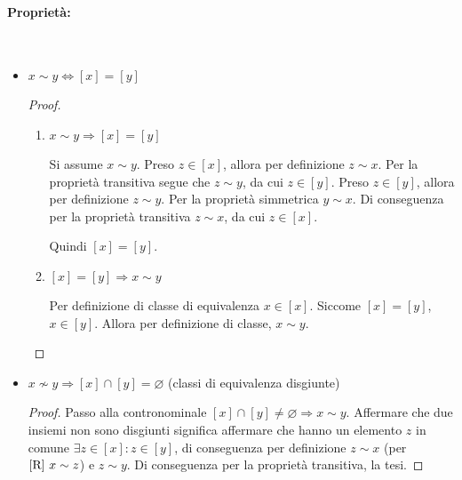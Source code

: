 \documentclass{article}     %
\begin{document}
\paragraph{Proprietà:}~
\begin{itemize}
    \item $x\sim y \Leftrightarrow [x]=[y]$
        \begin{proof}~
            \begin{enumerate}
                \item $x\sim y \Rightarrow [x]=[y]$
            
                Si assume $x\sim y$. 
                Preso $z\in [x]$, allora per definizione $z\sim x$. Per la proprietà transitiva segue che $z\sim y$, da cui $z\in [y]$.
                Preso $z\in [y]$, allora per definizione $z\sim y$. Per la proprietà simmetrica $y\sim x$. Di conseguenza per la proprietà transitiva $z\sim x$, da cui $z\in [x]$.
                
                Quindi $[x]=[y]$.
                \item $[x]=[y] \Rightarrow x\sim y$ 
            
                Per definizione di classe di equivalenza $x \in [x]$. Siccome $[x]=[y]$, $x\in [y]$. Allora per definizione di classe, $x\sim y$.
            \end{enumerate}
        \end{proof}
    \item $x\nsim y \Rightarrow [x]\cap[y]=\varnothing$ (classi di equivalenza disgiunte)
    \begin{proof}
        Passo alla contronominale $[x]\cap [y]\neq\varnothing\Rightarrow x\sim y$. Affermare che due insiemi non sono disgiunti significa affermare che hanno un elemento $z$ in comune $\exists z \in [x]: z\in [y]$, di conseguenza per definizione $z\sim x$  (per $[\textnormal{R}] ~x\sim z$)  e $z\sim y$.  Di conseguenza per la proprietà transitiva, la tesi.
    \end{proof}
    
\end{itemize}
\end{document}
